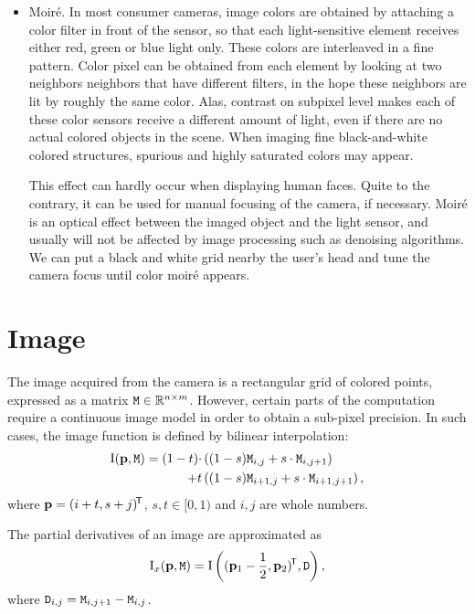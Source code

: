 \begin{itemize}
\item
Moiré.
In most consumer cameras, image colors are obtained by attaching a color filter in front of the sensor, so that each light-sensitive element receives either red, green or blue light only.
These colors are interleaved in a fine pattern.
Color pixel can be obtained from each element by looking at two neighbors neighbors that have different filters, in the hope these neighbors are lit by roughly the same color.
Alas, contrast on subpixel level makes each of these color sensors receive a different amount of light, even if there are no actual colored objects in the scene.
When imaging fine black-and-white colored structures, spurious and highly saturated colors may appear.

This effect can hardly occur when displaying human faces.
Quite to the contrary, it can be used for manual focusing of the camera, if necessary.
Moiré is an optical effect between the imaged object and the light sensor, and usually will not be affected by image processing such as denoising algorithms.
We can put a black and white grid nearby the user's head and tune the camera focus until color moiré appears.

\end{itemize}

\section{Image}
\label{s.imagemodel}

The image acquired from the camera is a rectangular grid of colored points, expressed as a matrix $\mathtt{M} \in \mathbb{R}^{n\times m}$.
However, certain parts of the computation require a continuous image model in order to obtain a sub-pixel precision.
In such cases, the image function is defined by bilinear interpolation:
\begin{align}
\mathrm{I}(\mathbf{p}, \mathtt{M}) = (1 - t) \cdot&\left((1 - s) \mathtt{M}_{i, j} + s \cdot \mathtt{M}_{i, j+1} \right) \\
+ t&\left((1 - s) \mathtt{M}_{i+1, j} + s \cdot \mathtt{M}_{i+1, j+1} \right), \notag
\end{align}
where $\mathbf{p} = (i + t, s + j)^{\!\mathsf{T}}$, $s, t \in \lbrack0, 1)$ and $i, j$ are whole numbers.

The partial derivatives of an image are approximated as
\begin{equation}
\mathrm{I}_x(\mathbf{p}, \mathtt{M}) = \mathrm{I}\left((\mathbf{p}_1 - \frac 1 2, \mathbf{p}_2)^{\!\mathsf{T}}, \mathtt{D}\right),
\end{equation}
where $\mathtt{D}_{i, j} = \mathtt{M}_{i,j+1} - \mathtt{M}_{i, j}$.

